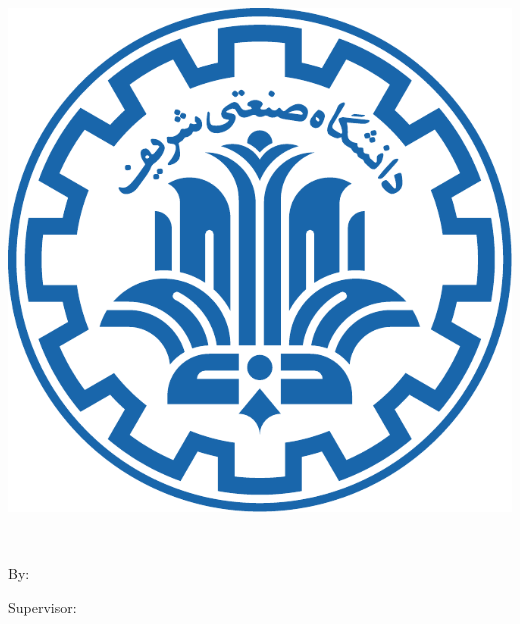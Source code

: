 \pagestyle{empty}

\begin{center}

\begin{latin}

\includegraphics[scale=0.25]{front/template/images/logo}

\EnglishThesisUniversity \\
\EnglishThesisDepartment

\begin{large}
\vspace{0.2cm}
\EnglishThesisType


\vspace{1cm}

{\Large\textbf{\EnglishThesisTitle}}

\vspace{1cm}

{\normalsize By:}\\
\textbf{\EnglishThesisAuthor}

\vspace{0.8cm}

{\normalsize Supervisor:}\\ 
\textbf{\EnglishThesisSupervisor}

\end{large}

\vspace{1.5cm}
\EnglishThesisDate

\end{latin}

\end{center}
